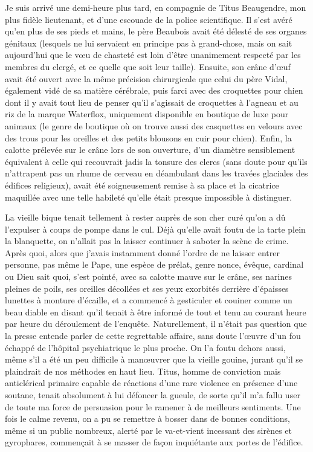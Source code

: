 Je suis arrivé une demi-heure plus tard, en compagnie de Titus Beaugendre, mon plus fidèle lieutenant, et d’une escouade de la police scientifique. Il s’est avéré qu’en plus de ses pieds et mains, le père Beaubois avait été délesté de ses organes génitaux (lesquels ne lui servaient en principe pas à grand-chose, mais on sait aujourd’hui que le vœu de chasteté est loin d’être unanimement respecté par les membres du clergé, et ce quelle que soit leur taille). Ensuite, son crâne d’œuf avait été ouvert avec la même précision chirurgicale que celui du père Vidal, également vidé de sa matière cérébrale, puis farci avec des croquettes pour chien dont il y avait tout lieu de penser qu’il s’agissait de croquettes à l’agneau et au riz de la marque Waterflox, uniquement disponible en boutique de luxe pour animaux (le genre de boutique où on trouve aussi des casquettes en velours avec des trous pour les oreilles et des petits blousons en cuir pour chien). Enfin, la calotte prélevée sur le crâne lors de son ouverture, d’un diamètre sensiblement équivalent à celle qui recouvrait jadis la tonsure des clercs (sans doute pour qu’ils n’attrapent pas un rhume de cerveau en déambulant dans les travées glaciales des édifices religieux), avait été soigneusement remise à sa place et la cicatrice maquillée avec une telle habileté qu’elle était presque impossible à distinguer.

La vieille bique tenait tellement à rester auprès de son cher curé qu’on a dû l’expulser à coups de pompe dans le cul. Déjà qu’elle avait foutu de la tarte plein la blanquette, on n’allait pas la laisser continuer à saboter la scène de crime. Après quoi, alors que j’avais instamment donné l’ordre de ne laisser entrer personne, pas même le Pape, une espèce de prélat, genre nonce, évêque, cardinal ou Dieu sait quoi, s’est pointé, avec sa calotte mauve sur le crâne, ses narines pleines de poils, ses oreilles décollées et ses yeux exorbités derrière d’épaisses lunettes à monture d’écaille, et a commencé à gesticuler et couiner comme un beau diable en disant qu’il tenait à être informé de tout et tenu au courant heure par heure du déroulement de l’enquête. Naturellement, il n’était pas question que la presse entende parler de cette regrettable affaire, sans doute l’œuvre d’un fou échappé de l’hôpital psychiatrique le plus proche. On l’a foutu dehors aussi, même s’il a été un peu difficile à manœuvrer que la vieille gouine, jurant qu’il se plaindrait de nos méthodes en haut lieu. Titus, homme de conviction mais anticlérical primaire capable de réactions d’une rare violence en présence d’une soutane, tenait absolument à lui défoncer la gueule, de sorte qu’il m’a fallu user de toute ma force de persuasion pour le ramener à de meilleurs sentiments. Une fois le calme revenu, on a pu se remettre à bosser dans de bonnes conditions, même si un public nombreux, alerté par le va-et-vient incessant des sirènes et gyrophares, commençait à se masser de façon inquiétante aux portes de l’édifice.

